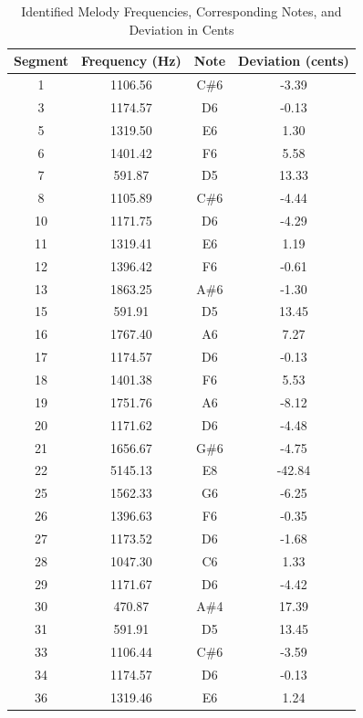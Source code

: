 \begin{table}[H]
    \centering
    \caption{Identified Melody Frequencies, Corresponding Notes, and Deviation in Cents}
    \begin{tabular}{cccc}
        \hline
        Segment & Frequency (Hz) & Note & Deviation (cents) \\
        \hline
        1  & 1106.56 & C\#6  & -3.39   \\
        3  & 1174.57 & D6    & -0.13   \\
        5  & 1319.50 & E6    & 1.30    \\
        6  & 1401.42 & F6    & 5.58    \\
        7  & 591.87  & D5    & 13.33   \\
        8  & 1105.89 & C\#6  & -4.44   \\
        10 & 1171.75 & D6    & -4.29   \\
        11 & 1319.41 & E6    & 1.19    \\
        12 & 1396.42 & F6    & -0.61   \\
        13 & 1863.25 & A\#6  & -1.30   \\
        15 & 591.91  & D5    & 13.45   \\
        16 & 1767.40 & A6    & 7.27    \\
        17 & 1174.57 & D6    & -0.13   \\
        18 & 1401.38 & F6    & 5.53    \\
        19 & 1751.76 & A6    & -8.12   \\
        20 & 1171.62 & D6    & -4.48   \\
        21 & 1656.67 & G\#6  & -4.75   \\
        22 & 5145.13 & E8    & -42.84  \\
        25 & 1562.33 & G6    & -6.25   \\
        26 & 1396.63 & F6    & -0.35   \\
        27 & 1173.52 & D6    & -1.68   \\
        28 & 1047.30 & C6    & 1.33    \\
        29 & 1171.67 & D6    & -4.42   \\
        30 & 470.87  & A\#4  & 17.39   \\
        31 & 591.91  & D5    & 13.45   \\
        33 & 1106.44 & C\#6  & -3.59   \\
        34 & 1174.57 & D6    & -0.13   \\
        36 & 1319.46 & E6    & 1.24    \\

\end{tabular}
\end{table}
